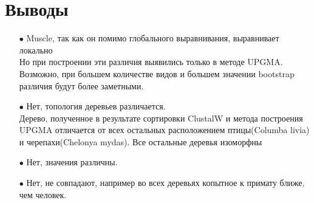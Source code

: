 \section{Выводы}
\begin{enumerate}
\item[$\bullet$] Muscle, так как он помимо глобального выравнивания, выравнивает локально\\
	Но при построении эти различия выявились только в методе UPGMA. Возможно, при большем количестве видов и большем значении bootstrap различия будут более заметными.
\item[$\bullet$] Нет, топология деревьев различается.\\
	Дерево, полученное в результате сортировки ClustalW и метода построения UPGMA отличается от всех остальных расположением птицы(Columba livia) и черепахи(Chelonya mydas). Все остальные деревья изоморфны
\item[$\bullet$] Нет, значения различны.
\item[$\bullet$] Нет, не совпадают, например во всех деревьях копытное к примату ближе, чем человек.
\end{enumerate}
